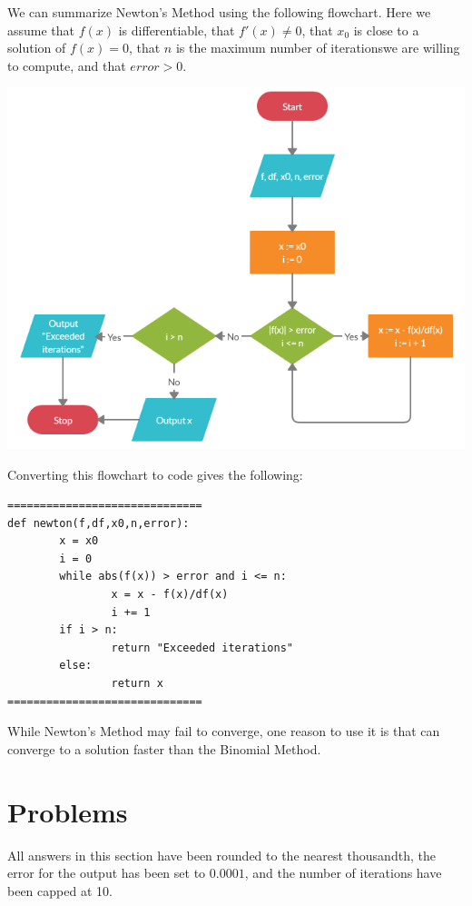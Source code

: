 \documentclass{ximera}
\begin{document}
We can summarize Newton's Method using the following flowchart. Here we assume that $f(x)$ is differentiable, that $f'(x)\neq 0$, that $x_0$ is close to a solution of $f(x)=0$, that $n$ is the maximum number of iterationswe are willing to compute, and that $error>0$.

\begin{center}
	\includegraphics{newton.png}
\end{center}

Converting this flowchart to code gives the following:

\begin{verbatim}
==============================
def newton(f,df,x0,n,error):
        x = x0
        i = 0
        while abs(f(x)) > error and i <= n:
                x = x - f(x)/df(x)
                i += 1
        if i > n:
                return "Exceeded iterations"
        else:
                return x
==============================
\end{verbatim}

While Newton's Method may fail to converge, one reason to use it is that can converge to a solution faster than the Binomial Method.

\section{Problems}

All answers in this section have been rounded to the nearest thousandth, the error for the output has been set to $0.0001$, and the number of iterations have been capped at 10.
\end{document}
